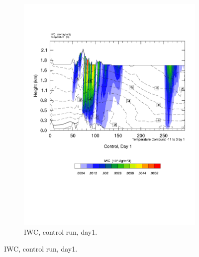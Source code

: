 \begin{figure}[ht]
\begin{subfigure}{0.48\textwidth}
        \includegraphics[width=\textwidth]{results/control/crossSec_IWC_Control_Day1.pdf}
        \caption{IWC, control run, day1.}
        \label{subfig:cross_IWC_day1}
    \end{subfigure}
    

\end{figure}
